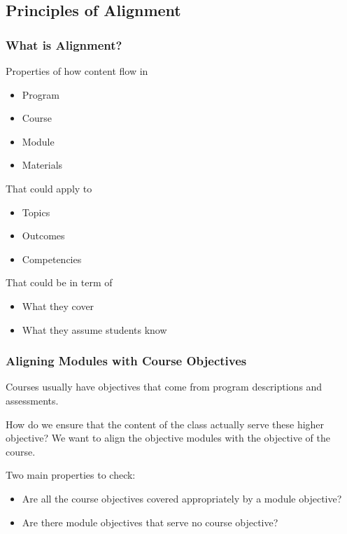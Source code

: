 \documentclass[aspectratio=169]{beamer}
\begin{document}
\subsection{Principles of Alignment}

\begin{frame}
  \frametitle{What is Alignment?}

  \begin{block}{Properties of how content flow in}
    \begin{itemize}
    \item Program
    \item Course
    \item Module
    \item Materials
    \end{itemize}
  \end{block}

  \begin{block}{That could apply to}
    \begin{itemize}
    \item Topics
    \item Outcomes
    \item Competencies
    \end{itemize}
  \end{block}

  \begin{block}{That could be in term of}
    \begin{itemize}
    \item What they cover
    \item What they assume students know
    \end{itemize}
  \end{block}
  
\end{frame}

\begin{frame}
  \frametitle{Aligning Modules with Course Objectives}
    Courses usually have objectives that come from program
    descriptions and assessments.

    How do we ensure that the content of the class actually serve
    these higher objective? We want to align the objective modules
    with the objective of the course.

    Two main properties to check:
    \begin{itemize}
    \item Are all the course objectives covered appropriately by a module objective?
    \item Are there module objectives that serve no course objective?
    \end{itemize}
\end{frame}
\end{document}
